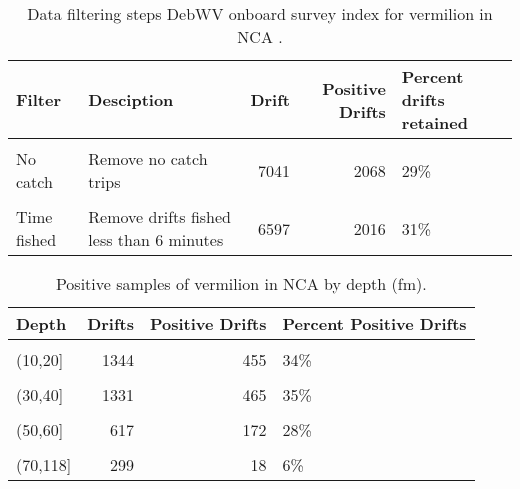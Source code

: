 \documentclass[
]{article}
\begin{document}
\begin{table}

\caption{\label{tab:tab-data-filter-debwv}Data filtering steps DebWV onboard survey index for vermilion in NCA .}
\centering
\begin{tabular}[t]{llrrl}
\toprule
Filter & Desciption & Drift & Positive Drifts & Percent drifts retained\\
\midrule
\cellcolor{gray!6}{All} & \cellcolor{gray!6}{None} & \cellcolor{gray!6}{7566} & \cellcolor{gray!6}{2593} & \cellcolor{gray!6}{34\%}\\
No catch & Remove no catch trips & 7041 & 2068 & 29\%\\
\cellcolor{gray!6}{Sparse data} & \cellcolor{gray!6}{Remove District 6 and 1987} & \cellcolor{gray!6}{6697} & \cellcolor{gray!6}{2022} & \cellcolor{gray!6}{30\%}\\
Time fished & Remove drifts fished less than 6 minutes & 6597 & 2016 & 31\%\\
\bottomrule
\end{tabular}
\end{table}

\begin{table}

\caption{\label{tab:tab-depth-debwv}Positive samples of vermilion in NCA by depth (fm).}
\centering
\begin{tabular}[t]{lrrl}
\toprule
Depth & Drifts & Positive Drifts &  Percent Positive Drifts\\
\midrule
\cellcolor{gray!6}{(0,10]} & \cellcolor{gray!6}{478} & \cellcolor{gray!6}{113} & \cellcolor{gray!6}{24\%}\\
(10,20] & 1344 & 455 & 34\%\\
\cellcolor{gray!6}{(20,30]} & \cellcolor{gray!6}{1198} & \cellcolor{gray!6}{410} & \cellcolor{gray!6}{34\%}\\
(30,40] & 1331 & 465 & 35\%\\
\cellcolor{gray!6}{(40,50]} & \cellcolor{gray!6}{1067} & \cellcolor{gray!6}{347} & \cellcolor{gray!6}{33\%}\\
\addlinespace
(50,60] & 617 & 172 & 28\%\\
\cellcolor{gray!6}{(60,70]} & \cellcolor{gray!6}{263} & \cellcolor{gray!6}{36} & \cellcolor{gray!6}{14\%}\\
(70,118] & 299 & 18 & 6\%\\
\bottomrule
\end{tabular}
\end{table}
\end{document}
